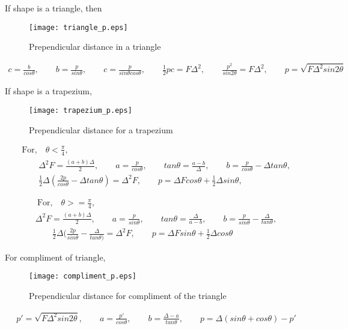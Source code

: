 If shape is a triangle, then
\begin{figure}[H]
\centering
 \texttt{[image: triangle\_p.eps]}
 \caption{Prependicular distance in a triangle}
\end{figure}

\begin{eqnarray*}
c=\frac{b}{cos\theta},
\qquad b=\frac{p}{sin\theta},
\qquad  c=\frac{p}{sin\theta cos\theta},
\qquad   \frac{1}{2}pc=F\Delta^2 ,
\qquad  \frac{p^2}{sin2\theta}=F\Delta^2,
\qquad p=\sqrt{F\Delta^2sin2\theta}
  \end{eqnarray*}

If shape is a trapezium, 

  \begin{figure}[H]
  \centering
    \texttt{[image: trapezium\_p.eps]}
    \caption{Prependicular distance for a trapezium}
  \end{figure} 
  \begin{eqnarray*}
     \text{For,} \quad \theta  < \frac{\pi}{4},\\
    \qquad \Delta^2 F =\frac{(a+b)\Delta}{2},
      \qquad a=\frac{p}{cos\theta},
      \qquad tan\theta=\frac{a-b}{\Delta},
      \qquad b=\frac{p}{cos\theta}-\Delta tan\theta, \\
      \qquad \frac{1}{2}\Delta(\frac{2p}{cos\theta}-\Delta tan\theta)=\Delta^2 F,
      \qquad p=\Delta Fcos\theta+\frac{1}{2}\Delta sin\theta,
  \end{eqnarray*}
  
\begin{eqnarray*}
\
\text{For,} \quad \theta  >= \frac{\pi}{4},\\
\Delta^2 F =\frac{(a+b)\Delta}{2},
\qquad a=\frac{p}{sin\theta},
\qquad tan\theta=\frac{\Delta}{a-b},
\qquad b=\frac{p}{sin\theta}-\frac{\Delta}{tan\theta}, \\
\qquad \frac{1}{2}\Delta(\frac{2p}{sin\theta}-\frac{\Delta}{tan\theta)}=\Delta^2 F,
\qquad p=\Delta Fsin\theta+\frac{1}{2}\Delta cos\theta
\end{eqnarray*}

For compliment of triangle,
\begin{figure}[H]
\centering
 \texttt{[image: compliment\_p.eps]}
 \caption{Prependicular distance for compliment of the triangle}
\end{figure}

\begin{eqnarray*} 
p'=\sqrt{F\Delta^2sin2\theta},
\qquad
a=\frac{p'}{cos\theta},
\qquad
b=\frac{\Delta-a}{tan\theta},
\qquad
p=\Delta(sin\theta+cos\theta)-p'
\end{eqnarray*}

